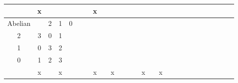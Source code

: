 \begin{longtable}{| c | c | c | c | c | c | c | c | c | c | c | c | c | c | c | c | c | c | c | c | c | c | c | c | c | c |}
 &  \cellcolor[HTML]{AA0044} x &   &   &   &   &   & \cellcolor[HTML]{AA0044} x &   &   &   &   &   &   &   &   &   &   &   &   &   &   &   &   &   \\ \hline
    \rowcolor{cyan} Abelian &
\( \begin{smallmatrix}
    3 & 2 & 1 & 0 \\
    2 & 3 & 0 & 1 \\
    1 & 0 & 3 & 2 \\
    0 & 1 & 2 & 3 \\
\end{smallmatrix} \)
 &  \cellcolor[HTML]{AA0044} x &   & \cellcolor[HTML]{AA0044} x &   &   &   & \cellcolor[HTML]{AA0044} x &   & \cellcolor[HTML]{AA0044} x &   &   &   & \cellcolor[HTML]{AA0044} x &   & \cellcolor[HTML]{AA0044} x &   &   &   &   &   &   &   &   &   \\ \hline
\end{longtable}
